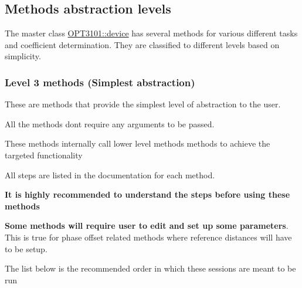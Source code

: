 \subsection*{\label{_Levels}%
Methods abstraction levels}

The master class \mbox{\hyperlink{class_o_p_t3101_1_1device}{O\+P\+T3101\+::device}} has several methods for various different tasks and coefficient determination. They are classified to different levels based on simplicity. \subsubsection*{Level 3 methods (Simplest abstraction)}


\begin{DoxyItemize}
\item These are methods that provide the simplest level of abstraction to the user.
\item All the methods don\textquotesingle{}t require any arguments to be passed.
\item These methods internally call lower level methods methods to achieve the targeted functionality
\item All steps are listed in the documentation for each method.
\item {\bfseries It is highly recommended to understand the steps before using these methods}
\item {\bfseries Some methods will require user to edit and set up some parameters}. This is true for phase offset related methods where reference distances will have to be setup.
\item The list below is the recommended order in which these sessions are meant to be run
\end{DoxyItemize}

